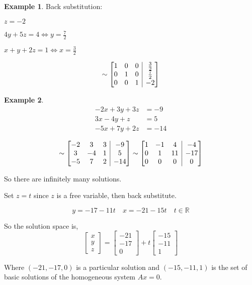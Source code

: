 \documentclass{report}
\makeatletter
\newenvironment{amatrix}[1]{%
  \left[\begin{array}{@{}*{#1}{c}|c@{}}
}{%
  \end{array}\right]
}
\theoremstyle{definition}
\newtheorem{ex}{Example}
\makeatother
\begin{document}
\begin{ex}
Back substitution:

$z=-2$

$4y+5z=4\Leftrightarrow y=\frac{7}{2}$

$x+y+2z=1\Leftrightarrow x=\frac{3}{2}$

\[\sim
\begin{amatrix}{3}
 1 & 0 & 0 & \frac{3}{2} \\
 0 & 1 & 0 & \frac{7}{2} \\
 0 & 0 & 1 & -2
\end{amatrix}
\]
\end{ex}

\begin{ex}
\begin{align*}
-2x+3y+3z&=-9 \\
3x-4y+z&=5 \\
-5x+7y+2z&=-14
\end{align*}

\[\sim
\begin{amatrix}{3}
 -2 & 3 & 3 & -9 \\
 3 & -4 & 1 & 5 \\
 -5 & 7 & 2 & -14
\end{amatrix}\sim
\begin{amatrix}{3}
 1 & -1 & 4 & -4 \\
 0 & 1 & 11 & -17 \\
 0 & 0 & 0 & 0
\end{amatrix}
\]

So there are infinitely many solutions.

Set $z=t$ since $z$ is a free variable, then back substitute.

\[y=-17-11t\quad x=-21-15t\quad t\in \mathbb{R}\]

So the solution space is,
\[\begin{bmatrix}
 x \\
 y \\
 z
\end{bmatrix} =
\begin{bmatrix}
 -21 \\
 -17 \\
 0
\end{bmatrix} +t
\begin{bmatrix}
 -15 \\
 -11 \\
 1
\end{bmatrix}
\]

Where $(-21, -17, 0)$ is a particular solution and $(-15, -11, 1)$ is the set of basic solutions of the homogeneous system $Ax=0$.
\end{ex}
\end{document}
